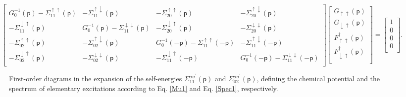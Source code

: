\documentclass[reprint,superscriptaddress,showpacs,nofootinbib,aps,pra]{revtex4-1}
\begin{document}
\begin{widetext}
\begin{equation}\label{Matr1}
  \left[
    \begin{array}{cccc}
      G^{-1}_0(\mathsf p) - \Sigma^{\uparrow \uparrow}_{11}(\mathsf p) & - \Sigma^{\uparrow \downarrow}_{11}(\mathsf p) & - \Sigma^{\uparrow \uparrow}_{20}(\mathsf p) & - \Sigma^{\uparrow \downarrow}_{20}(\mathsf p) \\
      - \Sigma^{\downarrow \uparrow}_{11}(\mathsf p) & G^{-1}_0(\mathsf p) - \Sigma^{\downarrow \downarrow}_{11}(\mathsf p) & - \Sigma^{\downarrow \uparrow}_{20}(\mathsf p) & - \Sigma^{\downarrow \downarrow}_{20}(\mathsf p) \\
      - \Sigma^{\uparrow \uparrow}_{02}(\mathsf p) & - \Sigma^{\uparrow \downarrow}_{02}(\mathsf p) & G^{-1}_0(-\mathsf p) - \Sigma^{\uparrow \uparrow}_{11}(-\mathsf p) & - \Sigma^{\uparrow \downarrow}_{11}(-\mathsf p) \\
      - \Sigma^{\downarrow \uparrow}_{02}(\mathsf p) & - \Sigma^{\downarrow \downarrow}_{02}(\mathsf p) & - \Sigma^{\downarrow \uparrow}_{11}(-\mathsf p) & G^{-1}_0(-\mathsf p) - \Sigma^{\downarrow \downarrow}_{11}(-\mathsf p) \\
    \end{array}
  \right] \left[
            \begin{array}{c}
              G_{\uparrow \uparrow}(\mathsf p) \\
              G_{\downarrow \uparrow}(\mathsf p) \\
              F^\dag_{\uparrow \uparrow}(\mathsf p) \\
              F^\dag_{\downarrow \uparrow}(\mathsf p) \\
            \end{array}
          \right]
          = \left[
              \begin{array}{c}
                1 \\
                0 \\
                0 \\
                0 \\
              \end{array}
            \right].
\end{equation}
\end{widetext}

\begin{figure*}[t]
  \noindent{}
  \caption{First-order diagrams in the expansion of the self-energies $\Sigma^{\sigma\sigma^\prime}_{11}(\mathsf p)$ and $\Sigma^{\sigma\sigma^\prime}_{02}(\mathsf p)$, defining the chemical potential and the spectrum of elementary excitations according to Eq. \eqref{Mu1} and Eq. \eqref{Spec1}, respectively.}
  \label{Firstorder}
\end{figure*} 
\end{document}
